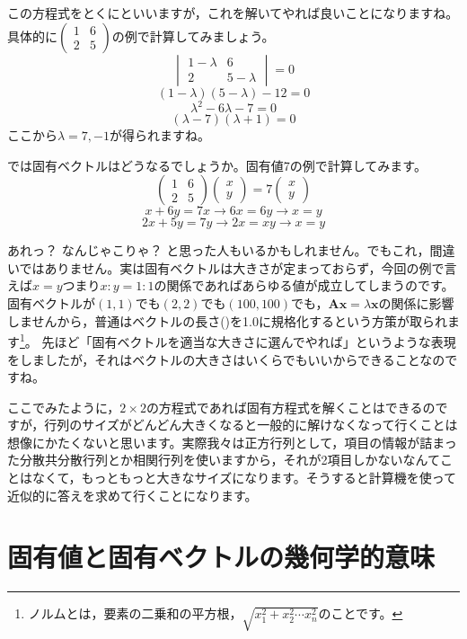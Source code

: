 \documentclass{ltjsbook}
\begin{document}
この方程式をとくにといいますが，これを解いてやれば良いことになりますね。具体的に$\begin{pmatrix}1&6\\2&5\end{pmatrix}$の例で計算してみましょう。
\[ \begin{vmatrix}1-\lambda & 6 \\ 2 & 5-\lambda\end{vmatrix}=0\]
\[ (1-\lambda)(5-\lambda) - 12 = 0 \]
\[ \lambda^2 - 6\lambda -7 = 0 \]
\[ (\lambda-7)(\lambda+1)=0\]
ここから$\lambda=7,-1$が得られますね。

では固有ベクトルはどうなるでしょうか。固有値7の例で計算してみます。
\[ \begin{pmatrix} 1 & 6 \\ 2 & 5 \end{pmatrix}\begin{pmatrix} x\\y\end{pmatrix} = 7 \begin{pmatrix} x\\y\end{pmatrix} \]
\[ x + 6y = 7x \to 6x = 6y \to x=y \]
\[ 2x+5y = 7y \to 2x = xy \to x=y \]

あれっ？ なんじゃこりゃ？ と思った人もいるかもしれません。でもこれ，間違いではありません。実は固有ベクトルは大きさが定まっておらず，今回の例で言えば$x=y$つまり$x:y=1:1$の関係であればあらゆる値が成立してしまうのです。
固有ベクトルが$(1,1)$でも$(2,2)$でも$(100,100)$でも，$\bm{Ax}=\lambda \bm{x}$の関係に影響しませんから，普通はベクトルの長さ()を1.0に規格化するという方策が取られます\footnote{ノルムとは，要素の二乗和の平方根，$\sqrt{x_1^2 + x_2^2 \cdots x_n^2}$のことです。}。
先ほど「固有ベクトルを適当な大きさに選んでやれば」というような表現をしましたが，それはベクトルの大きさはいくらでもいいからできることなのですね。

ここでみたように，$2\times2$の方程式であれば固有方程式を解くことはできるのですが，行列のサイズがどんどん大きくなると一般的に解けなくなって行くことは想像にかたくないと思います。実際我々は正方行列として，項目の情報が詰まった分散共分散行列とか相関行列を使いますから，それが2項目しかないなんてことはなくて，もっともっと大きなサイズになります。そうすると計算機を使って近似的に答えを求めて行くことになります。

\section{固有値と固有ベクトルの幾何学的意味}
\end{document}
